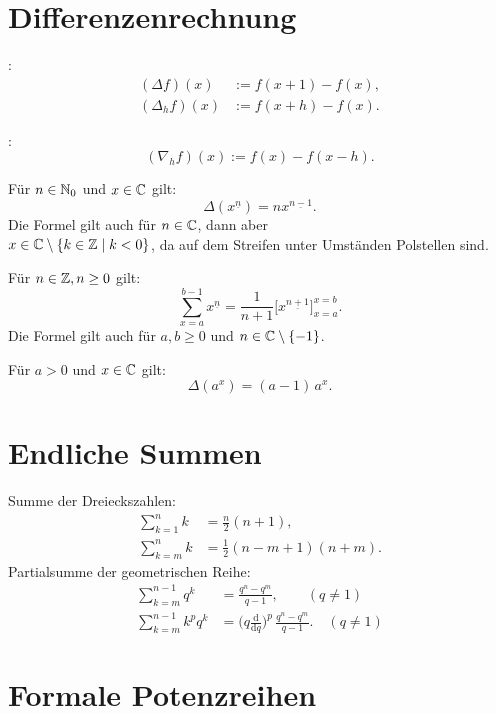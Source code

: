 \section{Differenzenrechnung}
\begin{definition}[Differenzoperator]
:
\begin{align}
(\Delta f)(x) &:= f(x+1)-f(x),\\
(\Delta_h f)(x) &:= f(x+h)-f(x).
\end{align}

:
\begin{equation}
(\nabla_h f)(x) := f(x)-f(x-h).
\end{equation}
\end{definition}
\noindent
Für $n\in\mathbb N_0$ und $x\in\mathbb C$ gilt:
\begin{equation}
\Delta(x^{\underline{n}}) = nx^{\underline{n-1}}.
\end{equation}
Die Formel gilt auch für $n\in\mathbb C$, dann aber\\
$x\in\mathbb C\setminus\{k\in\mathbb Z\mid k<0\}$, da auf dem Streifen unter
Umständen Polstellen sind.

Für $n\in\mathbb Z,n\ge 0$ gilt:
\begin{equation}
\sum_{x=a}^{b-1} x^{\underline n} = \frac{1}{n+1}\big[x^{\underline{n+1}}\big]_{x=a}^{x=b}.
\end{equation}
Die Formel gilt auch für $a,b\ge 0$ und $n\in\mathbb C\setminus\{-1\}$.

Für $a>0$ und $x\in\mathbb C$ gilt:
\begin{equation}
\Delta(a^x) = (a-1)\,a^x.
\end{equation}

\section{Endliche Summen}
Summe der Dreieckszahlen:
\begin{align}
\sum_{k=1}^n k &= \frac{n}{2}(n+1),\\
\sum_{k=m}^n k &= \frac{1}{2}(n-m+1)(n+m).
\end{align}
Partialsumme der geometrischen Reihe:
\begin{align}
\sum_{k=m}^{n-1} q^k &= \frac{q^n-q^m}{q-1},\qquad (q\ne 1)\\
\sum_{k=m}^{n-1} k^p q^k
&= \Big(q\frac{\mathrm d}{\mathrm dq}\Big)^p\,\frac{q^n-q^m}{q-1}.\quad (q\ne 1)
\end{align}

\section{Formale Potenzreihen}
